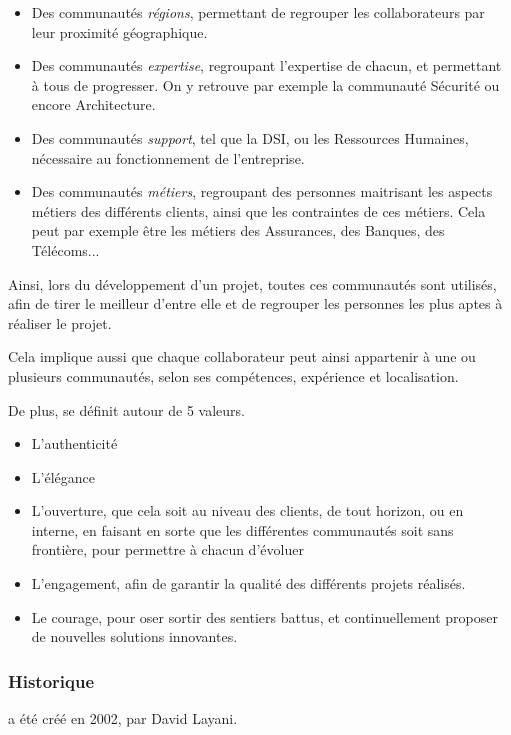 \begin{itemize}
	\item Des communautés \emph{régions}, permettant de regrouper les collaborateurs par leur proximité géographique.
	\item Des communautés \emph{expertise}, regroupant l'expertise de chacun, et permettant à tous de progresser. On y retrouve par exemple la communauté Sécurité ou encore Architecture.
	\item Des communautés \emph{support}, tel que la \gls{DSI}, ou les Ressources Humaines, nécessaire au fonctionnement de l'entreprise.
	\item Des communautés \emph{métiers}, regroupant des personnes maitrisant les aspects métiers des différents clients, ainsi que les contraintes de ces métiers. Cela peut par exemple être les métiers des Assurances, des Banques, des Télécoms... 
\end{itemize}

Ainsi, lors du développement d'un projet, toutes ces communautés sont utilisés, afin de tirer le meilleur d'entre elle et de regrouper les personnes les plus aptes à réaliser le projet.

Cela implique aussi que chaque collaborateur peut ainsi appartenir à une ou plusieurs communautés, selon ses compétences, expérience et localisation.

De plus, \onepoint{} se définit autour de 5 valeurs.

\begin{itemize}
	\item L'authenticité
	\item L'élégance
	\item L'ouverture, que cela soit au niveau des clients, de tout horizon, ou en interne, en faisant en sorte que les différentes communautés soit sans frontière, pour permettre à chacun d'évoluer
	\item L'engagement, afin de garantir la qualité des différents projets réalisés.
	\item Le courage, pour oser sortir des sentiers battus, et continuellement proposer de nouvelles solutions innovantes.
\end{itemize}

\subsubsection{Historique} 

\xmakefirstuc{\onepoint{}} a été créé en 2002, par David Layani.

